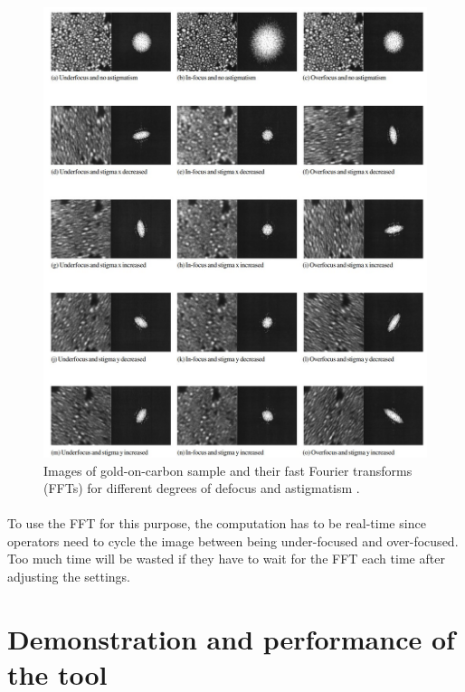 \documentclass[12pt, twocolumn]{report}
\begin{document}
\begin{figure}
    \centering
    \includegraphics[width=1.05\textwidth]{Figures/SEM astigmatism and FFT.jpg}
    \caption{Images of gold-on-carbon sample and their fast Fourier transforms (FFTs) for different degrees of defocus and astigmatism \cite{SEM correction algorithm}.}
    \label{SEM astigmatism}
\end{figure}

\paragraph{}
To use the FFT for this purpose, the computation has to be real-time since operators need to cycle the image between being under-focused and over-focused. Too much time will be wasted if they have to wait for the FFT each time after adjusting the settings.

\section{Demonstration and performance of the tool}
\end{document}
